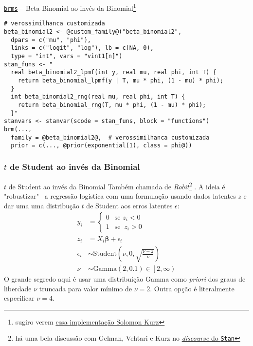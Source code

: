 \begin{frame}[fragile]{\href{https://paul-buerkner.github.io/brms/}{\texttt{brms}} -- Beta-Binomial ao invés da Binomial\footnote{sugiro verem \href{https://bookdown.org/content/4857/monsters-and-mixtures.html}{essa implementação Solomon Kurz}}}
    \begin{lstlisting}[basicstyle=\footnotesize]
# verossimilhanca customizada
beta_binomial2 <- @custom_family@("beta_binomial2",
  dpars = c("mu", "phi"),
  links = c("logit", "log"), lb = c(NA, 0),
  type = "int", vars = "vint1[n]")
stan_funs <- "
  real beta_binomial2_lpmf(int y, real mu, real phi, int T) {
    return beta_binomial_lpmf(y | T, mu * phi, (1 - mu) * phi);
  }
  int beta_binomial2_rng(real mu, real phi, int T) {
    return beta_binomial_rng(T, mu * phi, (1 - mu) * phi);
  }"
stanvars <- stanvar(scode = stan_funs, block = "functions")
brm(...,
  family = @beta_binomial2@,  # verossimilhanca customizada
  prior = c(..., @prior(exponential(1), class = phi@))
    \end{lstlisting}
\end{frame}

\subsubsection{$t$ de Student ao invés da Binomial}
\begin{frame}{$t$ de Student ao invés da Binomial}
    \small
    Também chamada de \textit{Robit}\footnote{há uma bela discussão com Gelman,
    Vehtari e Kurz no
    \href{https://discourse.mc-stan.org/t/robit-regression-not-robust/21245/}{
        \textit{discourse} do \texttt{Stan}}} \parencite{gelman2013bayesian, gelman2020regression}.
    A ideia é "robustizar"~ a regressão logística com uma formulação usando dados
    latentes $z$ e dar uma uma distribução $t$ de Student aos erros latentes $\epsilon$:
    $$
    \begin{aligned}
        y_i & = \begin{cases} 0 & \text{se } z_i < 0 \\ 1 & \text{se }\ z_i > 0 \end{cases}\\
        z_i & = X_i \boldsymbol{\beta} + \epsilon_i \\
        \epsilon_i &\sim \text{Student} \left (\nu, 0, \sqrt{\frac{\nu - 2}{\nu}} \right) \\
        \nu &\sim \text{Gamma}(2, 0.1) \in \left[2, \infty \right)
    \end{aligned}
    $$
    \footnotesize
    O grande segredo aqui é usar uma distribuição Gamma como \textit{priori}
    dos graus de liberdade $\nu$ truncada para valor mínimo de $\nu = 2$. Outra opção
    é literalmente especificar $\nu=4$.
\end{frame}

